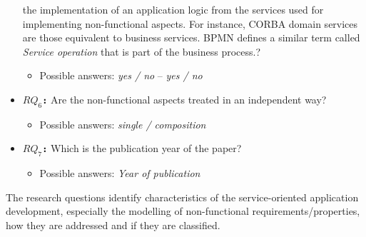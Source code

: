 \begin{itemize}
{{the implementation of an application logic from the services used for
implementing non-functional aspects. For instance, CORBA domain services are
those equivalent to  business services. BPMN \cite{bpmn} defines a similar term
called \textit{Service operation}  that is part of the business process.}}? 
\begin{itemize}
	  \item Possible answers: \textit{yes / no} -- \textit{yes / no}
	\end{itemize}  
  \item \textbf{\texttt{$RQ_6$:}} Are the non-functional aspects treated in
  an independent way?
\begin{itemize}
	  \item Possible answers: \textit{single / composition}
	\end{itemize}
\item \textbf{\texttt{$RQ_7$:}} Which is the publication year of the paper?
	\begin{itemize}
	  \item Possible answers: \textit{Year of publication}
	\end{itemize}	   
\end{itemize}



 
The research questions identify characteristics
 of the ser\-vice-oriented application development, especially the
modelling of non-functional requirements/properties, how they are addressed and
if they are classified.  
 
 
